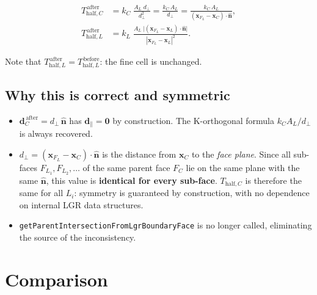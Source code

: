 \documentclass[11pt,a4paper]{article}
\begin{document}
\begin{align}
  T_{\mathrm{half},C}^{\,\text{after}}
    &= k_C\;\frac{A_L\;d_\perp}{d_\perp^{2}}
     = \frac{k_C\,A_L}{d_\perp}
     = \frac{k_C\,A_L}
            {(\mathbf{x}_{F_L}-\mathbf{x}_C)\cdot\hat{\mathbf{n}}},
  \label{eq:TC_after}\\[10pt]
  T_{\mathrm{half},L}^{\,\text{after}}
    &= k_L\;\frac{A_L\;\bigl|(\mathbf{x}_{F_L}-\mathbf{x}_L)
                               \cdot\hat{\mathbf{n}}\bigr|}
                 {|\mathbf{x}_{F_L}-\mathbf{x}_L|^{2}}.
  \label{eq:TL_after}
\end{align}

Note that $T_{\mathrm{half},L}^{\,\text{after}} =
T_{\mathrm{half},L}^{\,\text{before}}$: the fine cell is unchanged.

\subsection*{Why this is correct and symmetric}

\begin{itemize}
  \item $\mathbf{d}_C^{\,\text{after}} = d_\perp\,\hat{\mathbf{n}}$
        has $\mathbf{d}_\parallel = \mathbf{0}$ by construction.
        The K-orthogonal formula $k_C A_L / d_\perp$ is always recovered.

  \item $d_\perp = (\mathbf{x}_{F_L} - \mathbf{x}_C)\cdot\hat{\mathbf{n}}$
        is the distance from $\mathbf{x}_C$ to the \emph{face plane}.
        Since all sub-faces $F_{L_1}, F_{L_2}, \ldots$ of the same parent
        face $F_C$ lie on the same plane with the same $\hat{\mathbf{n}}$,
        this value is \textbf{identical for every sub-face}.
        $T_{\mathrm{half},C}$ is therefore the same for all $L_i$:
        symmetry is guaranteed by construction, with no dependence on
        internal LGR data structures.

  \item \texttt{getParentIntersectionFromLgrBoundaryFace} is no longer
        called, eliminating the source of the inconsistency.
\end{itemize}

\section*{Comparison}
\end{document}
